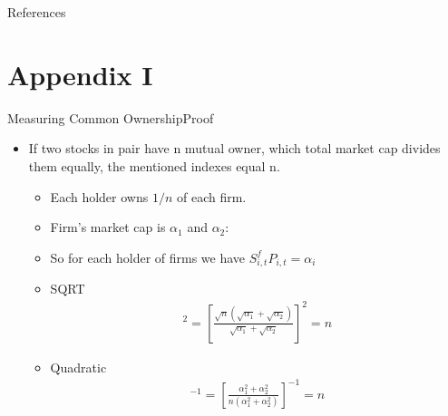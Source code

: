 \documentclass{beamer}
\begin{document}
	\tiny
	\begin{frame}[allowframebreaks]{References}
		
		{		
			
			
		}
	\end{frame}
	
	\normalsize
	
	
	\color{black}
	\appendix
	
	
	
	
	
	
	\section{Appendix I}
	\begin{frame}{Measuring Common Ownership}{Proof}\label{Proof}
		
		
		\begin{itemize}
			\item  If two stocks in pair have n mutual owner, which total market cap divides them equally, the mentioned indexes equal n.
			
			\begin{itemize}
				
				\item Each holder owns $ 1/n $ of each firm.
				\item Firm's market cap is $ \alpha_1 $ and $ \alpha_2 $:
				\item So for each holder of firms we have $ S^f_{i,t}P_{i,t} = \alpha_i $
				\item    SQRT
				\begin{align*}
					[  \frac{\sum_{f=1}^{n} \sqrt{\alpha_1/n}+\sum_{f=1}^{n} \sqrt{\alpha_2/n}}{\sqrt{\alpha_1} + \sqrt{\alpha_2}}]^2 
					= [\frac{\sqrt{n}(\sqrt{\alpha_1} +\sqrt{\alpha_2 })}{\sqrt{\alpha_1} + \sqrt{\alpha_2}}]^2 = n
				\end{align*}                  
				
				
				\item	 Quadratic
				\begin{align*}
					[  \frac{\sum_{f=1}^{n} {(\alpha_1/n)^2}+\sum_{f=1}^{n} {(\alpha_2/n)^2}}{\alpha_1^2 +{\alpha_2}^2}]^{-1} 
					=[\frac{{\alpha_1^2 + \alpha_2^2 }}{n(\alpha_1^2 + \alpha_2^2)}]^{-1} = n
				\end{align*}
				
			\end{itemize}
		\end{itemize}
		
		\hfill
		\hyperlink{Intuition}{}
		
	\end{frame}
	
\end{document}
